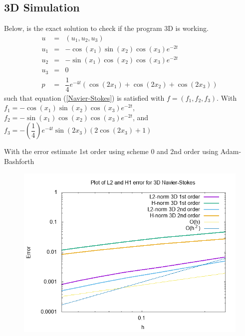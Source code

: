 \documentclass[a4paper,10pt]{article}
\begin{document}
\newpage
\subsection{ 3D Simulation}
Below, is the exact solution to check if the program 3D is working.
\begin{eqnarray}\nonumber
u &=& (u_{1},u_{2},u_{3}) \\ \nonumber
u_{1} &=& -\cos(x_{1}) \sin(x_{2}) \cos(x_3) e^{-2t}\\ \nonumber
u_{2} &=& -\sin(x_{1}) \cos(x_{2}) \cos(x_3) e^{-2t}\\ \nonumber
u_{3} &=& 0 \\ \nonumber
p&=& \dfrac{1}{4} e^{-4t} (\cos(2x_1)+\cos(2x_2)+\cos(2x_3))
\end{eqnarray}
such that equation (\ref{Navier-Stokes}) is satisfied with $ f = (f_{1},f_{2},f_3) $. With $ f_{1} = -\cos(x_1) \sin(x_2) \cos(x_3) e^{-2t} $, $ f_{2} = -\sin(x_1) \cos(x_2) \cos(x_3) e^{-2t}  $, and $ f_{3} = -(\dfrac{1}{4})e^{-4t}\sin(2x_3)(2\cos(2x_3)+1)   $

With the error estimate 1st order using scheme 0 and 2nd order using Adam-Bashforth
\begin{figure}[h!]
	\centering
	\includegraphics[width=0.7\linewidth]{NS_3D/error_NS_3D}
	\caption{}
	\label{fig:errorns3d}
\end{figure}
\end{document}

